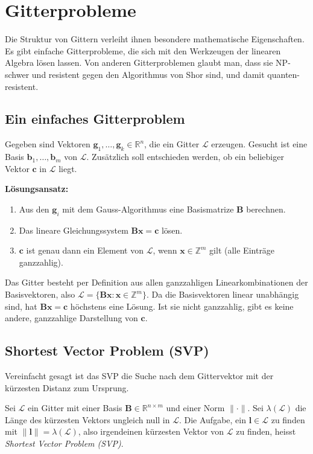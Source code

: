 \chapter{Gitterprobleme}\label{ch:lattice_problems}

Die Struktur von Gittern verleiht ihnen besondere mathematische Eigenschaften. Es gibt \glqq einfache\grqq{} Gitterprobleme, die sich mit den Werkzeugen der linearen Algebra lösen lassen. Von anderen Gitterproblemen glaubt man, dass sie NP-schwer und resistent gegen den Algorithmus von Shor sind, und damit quanten-resistent.

\section{Ein einfaches Gitterproblem}
Gegeben sind Vektoren $\mathbf{g}_1, \dots, \mathbf{g}_k \in \mathbb{R}^n$, die ein Gitter $\mathcal{L}$ erzeugen. Gesucht ist eine Basis $\mathbf{b}_1, \dots, \mathbf{b}_m$ von $\mathcal{L}$. Zusätzlich soll entschieden werden, ob ein beliebiger Vektor $\mathbf{c}$ in $\mathcal{L}$ liegt.

\textbf{Lösungsansatz:}
\begin{enumerate}
    \item Aus den $\mathbf{g}_i$ mit dem Gauss-Algorithmus eine Basismatrize $\mathbf{B}$ berechnen.
    \item Das lineare Gleichungssystem $\mathbf{B}\mathbf{x} = \mathbf{c}$ lösen.
    \item $\mathbf{c}$ ist genau dann ein Element von $\mathcal{L}$, wenn $\mathbf{x} \in \mathbb{Z}^m$ gilt (alle Einträge ganzzahlig).
\end{enumerate}

Das Gitter besteht per Definition aus allen ganzzahligen Linearkombinationen der Basisvektoren, also $\mathcal{L} = \{\mathbf{B}\mathbf{x} : \mathbf{x} \in \mathbb{Z}^m\}$. Da die Basisvektoren linear unabhängig sind, hat $\mathbf{B}\mathbf{x} = \mathbf{c}$ höchstens eine Lösung. Ist sie nicht ganzzahlig, gibt es keine andere, ganzzahlige Darstellung von $\mathbf{c}$.

\section{Shortest Vector Problem (SVP)}
Vereinfacht gesagt ist das SVP die Suche nach dem Gittervektor mit der kürzesten Distanz zum Ursprung.

\begin{definition}
    Sei $\mathcal{L}$ ein Gitter mit einer Basis $\mathbf{B} \in \mathbb{R}^{n \times m}$ und einer Norm $\|\cdot\|$. Sei $\lambda(\mathcal{L})$ die Länge des kürzesten Vektors ungleich null in $\mathcal{L}$. Die Aufgabe, ein $\mathbf{l} \in \mathcal{L}$ zu finden mit $\|\mathbf{l}\| = \lambda(\mathcal{L})$, also irgendeinen kürzesten Vektor von $\mathcal{L}$ zu finden, heisst \textit{Shortest Vector Problem (SVP)}.
\end{definition}

